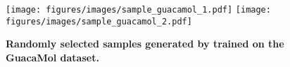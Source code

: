 \begin{figure}[H]
    \centering
    \texttt{[image: figures/images/sample\_guacamol\_1.pdf]}
    \texttt{[image: figures/images/sample\_guacamol\_2.pdf]}
    \caption{\textbf{Randomly selected samples generated by \methodname{} trained on the GuacaMol dataset.}}
    \label{fig:sample_guacamol}
\end{figure}